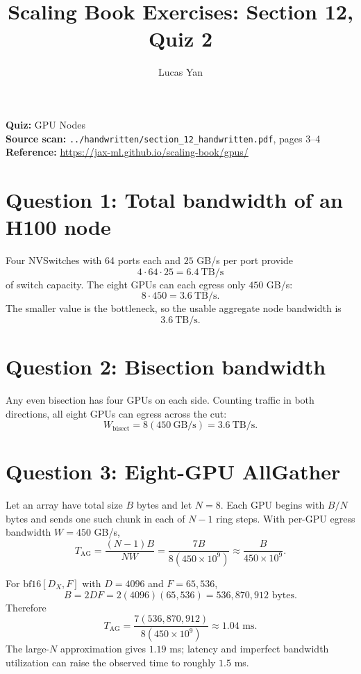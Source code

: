 \documentclass[11pt]{article}
\title{Scaling Book Exercises: Section 12, Quiz 2}
\author{Lucas Yan}
\date{}
\begin{document}
\maketitle

\noindent
\textbf{Quiz:} GPU Nodes\\
\textbf{Source scan:} \texttt{../handwritten/section\_12\_handwritten.pdf},
pages 3--4\\
\textbf{Reference:} \url{https://jax-ml.github.io/scaling-book/gpus/}

\section*{Question 1: Total bandwidth of an H100 node}

Four NVSwitches with 64 ports each and \(25\) GB/s per port provide
\[
4\cdot64\cdot25=\boxed{6.4\ \text{TB/s}}
\]
of switch capacity.  The eight GPUs can each egress only \(450\) GB/s:
\[
8\cdot450=\boxed{3.6\ \text{TB/s}}.
\]
The smaller value is the bottleneck, so the usable aggregate node bandwidth
is
\[
\boxed{3.6\ \text{TB/s}.}
\]

\section*{Question 2: Bisection bandwidth}

Any even bisection has four GPUs on each side.  Counting traffic in both
directions, all eight GPUs can egress across the cut:
\[
\boxed{W_{\mathrm{bisect}}=8(450\ \text{GB/s})=3.6\ \text{TB/s}.}
\]

\section*{Question 3: Eight-GPU AllGather}

Let an array have total size \(B\) bytes and let \(N=8\).  Each GPU begins
with \(B/N\) bytes and sends one such chunk in each of \(N-1\) ring steps.
With per-GPU egress bandwidth \(W=450\) GB/s,
\[
T_{\mathrm{AG}}
=\frac{(N-1)B}{NW}
=\frac{7B}{8(450\times10^9)}
\approx\frac{B}{450\times10^9}.
\]

For \(\mathrm{bf16}[D_X,F]\) with \(D=4096\) and \(F=65{,}536\),
\[
B=2DF
=2(4096)(65{,}536)
=536{,}870{,}912\text{ bytes}.
\]
Therefore
\[
\boxed{
T_{\mathrm{AG}}
=\frac{7(536{,}870{,}912)}
       {8(450\times10^9)}
\approx1.04\text{ ms}.}
\]
The large-\(N\) approximation gives \(1.19\) ms; latency and imperfect
bandwidth utilization can raise the observed time to roughly \(1.5\) ms.
\end{document}

